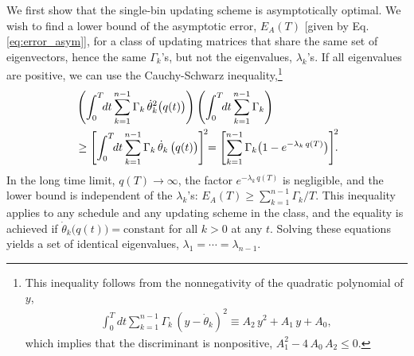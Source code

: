 \documentclass[preprint, superscriptaddress, floatfix]{revtex4-1}
\newcommand{\Err}{E}
\begin{document}
We first show
that the single-bin updating scheme is asymptotically optimal.
%
We wish to find a lower bound of the asymptotic error,
$\Err_A(T)$ [given by Eq. \eqref{eq:error_asym}],
for a class of updating matrices that
share the same set of eigenvectors,
hence the same $\Gamma_k$'s,
but not the eigenvalues,
$\lambda_k$'s.
%
If all eigenvalues are positive,
we can use the Cauchy-Schwarz inequality,\footnote{This
  inequality follows from the nonnegativity of
  the quadratic polynomial of $y$,
  \begin{align*}
  \int_0^T \!\!dt \sum_{k = 1}^{n-1} \Gamma_k \,
      ( y - {\dot \theta}_k )^2
    \equiv
    A_2 \, y^2 + A_1 \, y + A_0
    ,
  \end{align*}
  which implies that the discriminant is nonpositive,
  $A_1^2 - 4 \, A_0 \, A_2 \le 0$.}
%
%
\begin{align}
  &
  \left(
    \int_0^T \!\!dt
      \sum_{k = 1}^{n-1}
        \Gamma_k \, {\dot \theta}_k^2\bigl( q(t) \bigr)
  \right)
  \left(
    \int_0^T \!\!dt
      \sum_{k = 1}^{n-1}
        \Gamma_k
  \right)
  \notag \\
  & %
  \ge
  \Biggl[
    \int_0^T \!\!dt
      \sum_{k = 1}^{n-1}
        \Gamma_k \, {\dot \theta}_k \, \bigl( q(t) \bigr)
  \Biggr]^{\!2}
  \!\!=
  \Biggl[
    \sum_{k = 1}^{n-1} \Gamma_k
      \bigl(
        1 - e^{ -\lambda_k \, q(T) }
      \bigr)
  \Biggr]^{\!2}
  \!\!
  .
  \notag
\end{align}
%
In the long time limit, $q(T) \to \infty$,
the factor $e^{-\lambda_k \, q(T)}$ is negligible,
and the lower bound is independent of the $\lambda_k$'s:
$\Err_A(T) \ge \sum_{k=1}^{n-1} \Gamma_k/T$.
%
This inequality applies to any schedule
and any updating scheme in the class,
and the equality is achieved
if $\dot \theta_k\bigl( q(t) \bigr) = \mathrm{constant}$
for all $k > 0$ at any $t$.
%
Solving these equations yields
a set of identical eigenvalues,
$\lambda_1 = \cdots = \lambda_{n-1}$.
\end{document}
